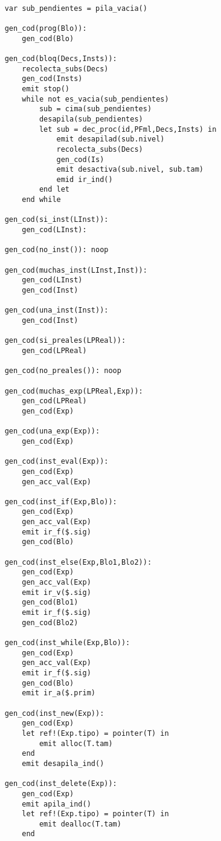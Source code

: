 \begin{lstlisting}

    var sub_pendientes = pila_vacia()

    gen_cod(prog(Blo)):
        gen_cod(Blo)

    gen_cod(bloq(Decs,Insts)):
        recolecta_subs(Decs)
        gen_cod(Insts)
        emit stop()
        while not es_vacia(sub_pendientes)
            sub = cima(sub_pendientes)
            desapila(sub_pendientes)
            let sub = dec_proc(id,PFml,Decs,Insts) in
                emit desapilad(sub.nivel)
                recolecta_subs(Decs)
                gen_cod(Is)
                emit desactiva(sub.nivel, sub.tam)
                emid ir_ind()
            end let
        end while

    gen_cod(si_inst(LInst)):
        gen_cod(LInst):

    gen_cod(no_inst()): noop

    gen_cod(muchas_inst(LInst,Inst)):
        gen_cod(LInst)
        gen_cod(Inst)

    gen_cod(una_inst(Inst)):
        gen_cod(Inst)

    gen_cod(si_preales(LPReal)):
        gen_cod(LPReal)

    gen_cod(no_preales()): noop

    gen_cod(muchas_exp(LPReal,Exp)):
        gen_cod(LPReal)
        gen_cod(Exp)

    gen_cod(una_exp(Exp)):
        gen_cod(Exp)

    gen_cod(inst_eval(Exp)):
        gen_cod(Exp)
        gen_acc_val(Exp)

    gen_cod(inst_if(Exp,Blo)):
        gen_cod(Exp)
        gen_acc_val(Exp)
        emit ir_f($.sig)
        gen_cod(Blo)

    gen_cod(inst_else(Exp,Blo1,Blo2)):
        gen_cod(Exp)
        gen_acc_val(Exp)
        emit ir_v($.sig)
        gen_cod(Blo1)
        emit ir_f($.sig)
        gen_cod(Blo2)

    gen_cod(inst_while(Exp,Blo)):
        gen_cod(Exp)
        gen_acc_val(Exp)
        emit ir_f($.sig)
        gen_cod(Blo)
        emit ir_a($.prim)

    gen_cod(inst_new(Exp)):
        gen_cod(Exp)
        let ref!(Exp.tipo) = pointer(T) in
            emit alloc(T.tam)
        end
        emit desapila_ind()

    gen_cod(inst_delete(Exp)):
        gen_cod(Exp)
        emit apila_ind()
        let ref!(Exp.tipo) = pointer(T) in
            emit dealloc(T.tam)
        end


\end{lstlisting}

